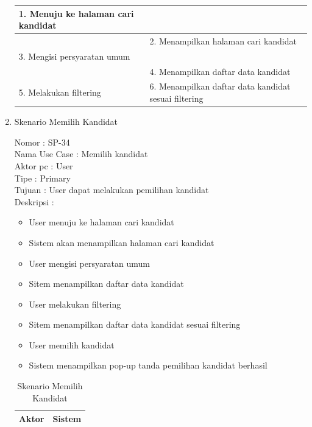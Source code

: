 \begin{enumerate}
\begin{table}
\begin{tabular}{ | l | p{67.5mm}|}
		1.	Menuju ke halaman cari kandidat &  \\
		
		\hline
		
		&  2.	Menampilkan halaman cari kandidat \\
		
		\hline
		
		3. Mengisi persyaratan umum & \\
		
		\hline
		
		& 4. Menampilkan daftar data kandidat \\
		\hline
		
		5. Melakukan filtering
		
		& 6. Menampilkan daftar data kandidat sesuai filtering \\
		\hline
		
	\end{tabular}
\end{table}

\item Skenario Memilih Kandidat

Nomor \kern 3.6pc : SP-34 \\
Nama Use Case : Memilih kandidat \\
Aktor  pc : User \\
Tipe \kern 4.6pc : Primary \\
Tujuan \kern 3.6pc : User dapat melakukan pemilihan kandidat \\
Deskripsi \kern 2.5pc : 

\begin{itemize}
	\item User menuju ke halaman cari kandidat
	\item Sistem akan menampilkan halaman cari kandidat
	\item User mengisi persyaratan umum
	\item Sitem menampilkan daftar data kandidat
	\item User melakukan filtering
	\item Sitem menampilkan daftar data kandidat sesuai filtering
	\item User memilih kandidat
	\item Sistem menampilkan pop-up tanda pemilihan kandidat berhasil
	
\end{itemize}

\begin{table}
	\caption{Skenario Memilih Kandidat}
	\centering
	\begin{tabular}{ | l | p{67.5mm}|}
		\hline 
		\textbf{Aktor} & \textbf{Sistem} \\
		\hline
		

\end{tabular}
\end{table}
\end{enumerate}
